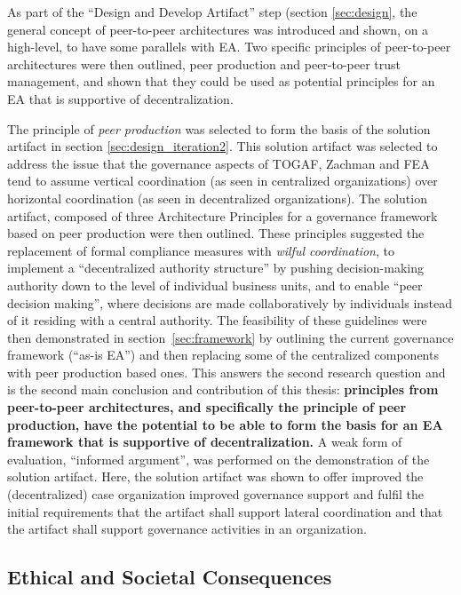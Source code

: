 As part of the ``Design and Develop Artifact'' step (section \ref{sec:design}, the general concept of peer-to-peer architectures was introduced and shown, on a high-level, to have some parallels with EA. Two specific principles of peer-to-peer architectures were then outlined, peer production and peer-to-peer trust management, and shown that they could be used as potential principles for an EA that is supportive of decentralization. 

The principle of \textit{peer production} was selected to form the basis of the solution artifact in section \ref{sec:design_iteration2}. This solution artifact was selected to address the issue that the governance aspects of TOGAF, Zachman and FEA tend to assume vertical coordination (as seen in centralized organizations) over horizontal coordination (as seen in decentralized organizations). The solution artifact, composed of three Architecture Principles for a governance framework based on peer production were then outlined. These principles suggested the replacement of formal compliance measures with \textit{wilful coordination}, to implement a ``decentralized authority structure'' by pushing decision-making authority down to the level of individual business units, and to enable ``peer decision making'', where decisions are made collaboratively by individuals instead of it residing with a central authority. The feasibility of these guidelines were then demonstrated in section~\ref{sec:framework} by outlining the current governance framework (``as-is EA'') and then replacing some of the centralized components with peer production based ones. This answers the second research question and is the second main conclusion and contribution of this thesis: \textbf{principles from peer-to-peer architectures, and specifically the principle of peer production, have the potential to be able to form the basis for an EA framework that is supportive of decentralization.} A weak form of evaluation, ``informed argument'', was performed on the demonstration of the solution artifact. Here, the solution artifact was shown to offer improved the (decentralized) case organization improved governance support and fulfil the initial requirements that the artifact shall support lateral coordination and that the artifact shall support governance activities in an organization.


\subsection{Ethical and Societal Consequences}
% 
% 
% 

